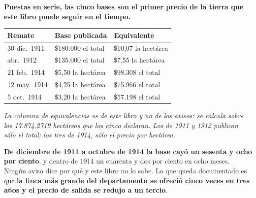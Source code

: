 \textbf{Puestas en serie, las cinco bases son el primer precio de la tierra que este libro
puede seguir en el tiempo.}

\begin{center}\small
\begin{tabular}{@{}lll@{}}
\toprule
\textbf{Remate} & \textbf{Base publicada} & \textbf{Equivalente} \\
\midrule
30 dic.\ 1911 & \$180.000 el total & \$10,07 la hectárea \\
abr.\ 1912 & \$135.000 el total & \$7,55 la hectárea \\
21 feb.\ 1914 & \$5,50 la hectárea & \$98.308 el total \\
12 may.\ 1914 & \$4,25 la hectárea & \$75.966 el total \\
5 oct.\ 1914 & \$3,20 la hectárea & \$57.198 el total \\
\bottomrule
\end{tabular}
\end{center}

\textit{La columna de equivalencias es de este libro y no de los avisos: se calcula sobre las
17.874,2719 hectáreas que los cinco declaran. Los de 1911 y 1912 publican sólo el total; los
tres de 1914, sólo el precio por hectárea.}

\textbf{De diciembre de 1911 a octubre de 1914 la base cayó un sesenta y ocho por ciento}, y
dentro de 1914 un cuarenta y dos por ciento en ocho meses. Ningún aviso dice por qué y este
libro no lo sabe. Lo que queda documentado es que \textbf{la finca más grande del departamento
se ofreció cinco veces en tres años y el precio de salida se redujo a un tercio}.

